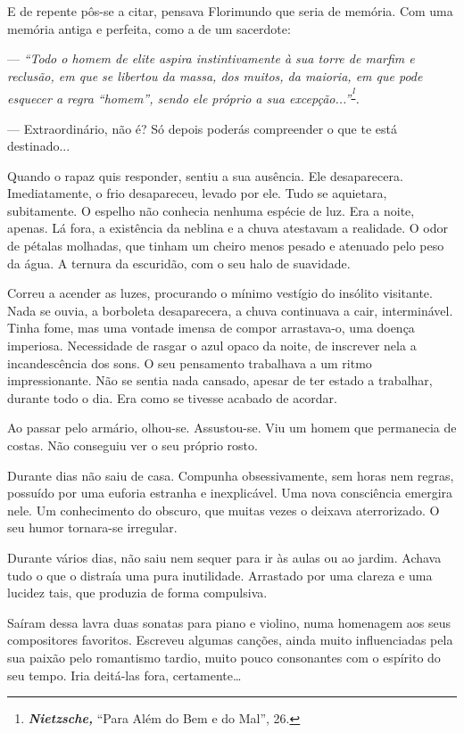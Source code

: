 E de repente pôs-se a citar, pensava Florimundo que seria de memória.
Com uma memória antiga e perfeita, como a de um sacerdote:

--- \emph{``Todo o homem de elite aspira instintivamente à sua torre de
marfim e reclusão, em que se libertou da massa, dos muitos, da maioria,
em que pode esquecer a regra ``homem'', sendo ele próprio a sua
excepção...''}\textsuperscript{\emph{\footnote{\emph{\textbf{Nietzsche,
  }}``Para Além do Bem e do Mal'', 26.}}}\emph{.}

--- Extraordinário, não é? Só depois poderás compreender o que te está
destinado...

Quando o rapaz quis responder, sentiu a sua ausência. Ele desaparecera.
Imediatamente, o frio desapareceu, levado por ele. Tudo se aquietara,
subitamente. O espelho não conhecia nenhuma espécie de luz. Era a noite,
apenas. Lá fora, a existência da neblina e a chuva atestavam a
realidade. O odor de pétalas molhadas, que tinham um cheiro menos pesado
e atenuado pelo peso da água. A ternura da escuridão, com o seu halo de
suavidade.

Correu a acender as luzes, procurando o mínimo vestígio do insólito
visitante. Nada se ouvia, a borboleta desaparecera, a chuva continuava a
cair, interminável. Tinha fome, mas uma vontade imensa de compor
arrastava-o, uma doença imperiosa. Necessidade de rasgar o azul opaco da
noite, de inscrever nela a incandescência dos sons. O seu pensamento
trabalhava a um ritmo impressionante. Não se sentia nada cansado, apesar
de ter estado a trabalhar, durante todo o dia. Era como se tivesse
acabado de acordar.

Ao passar pelo armário, olhou-se. Assustou-se. Viu um homem que
permanecia de costas. Não conseguiu ver o seu próprio rosto.

Durante dias não saiu de casa. Compunha obsessivamente, sem horas nem
regras, possuído por uma euforia estranha e inexplicável. Uma nova
consciência emergira nele. Um conhecimento do obscuro, que muitas vezes
o deixava aterrorizado. O seu humor tornara-se irregular.

Durante vários dias, não saiu nem sequer para ir às aulas ou ao jardim.
Achava tudo o que o distraía uma pura inutilidade. Arrastado por uma
clareza e uma lucidez tais, que produzia de forma compulsiva.

Saíram dessa lavra duas sonatas para piano e violino, numa homenagem aos
seus compositores favoritos. Escreveu algumas canções, ainda muito
influenciadas pela sua paixão pelo romantismo tardio, muito pouco
consonantes com o espírito do seu tempo. Iria deitá-las fora,
certamente\ldots{}

